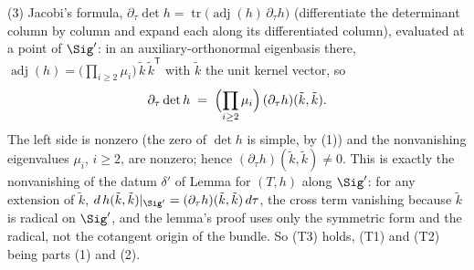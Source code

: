 (3) Jacobi's formula, $\partial_\tau \det h = \operatorname{tr}\bigl(\operatorname{adj}(h)\, \partial_\tau h\bigr)$ (differentiate the determinant column by column and expand each along its differentiated column), evaluated at a point of $\Sig'$: in an auxiliary-orthonormal eigenbasis there, $\operatorname{adj}(h) = \bigl(\prod_{i \geq 2} \mu_i\bigr)\, \tilde k\, \tilde k^{\mathsf T}$ with $\tilde k$ the unit kernel vector, so
\[
\partial_\tau \det h \;=\; \Bigl(\prod_{i \geq 2} \mu_i\Bigr)\, (\partial_\tau h)(\tilde k, \tilde k) .
\]
The left side is nonzero (the zero of $\det h$ is simple, by (1)) and the nonvanishing eigenvalues $\mu_i$, $i \geq 2$, are nonzero; hence $(\partial_\tau h)(\tilde k, \tilde k) \neq 0$. This is exactly the nonvanishing of the datum $\delta'$ of Lemma  for $(T, h)$ along $\Sig'$: for any extension of $\tilde k$, $d\,h(\tilde k, \tilde k)|_{\Sig'} = (\partial_\tau h)(\tilde k, \tilde k)\, d\tau$, the cross term vanishing because $\tilde k$ is radical on $\Sig'$, and the lemma's proof uses only the symmetric form and the radical, not the cotangent origin of the bundle. So (T3) holds, (T1) and (T2) being parts (1) and (2).
